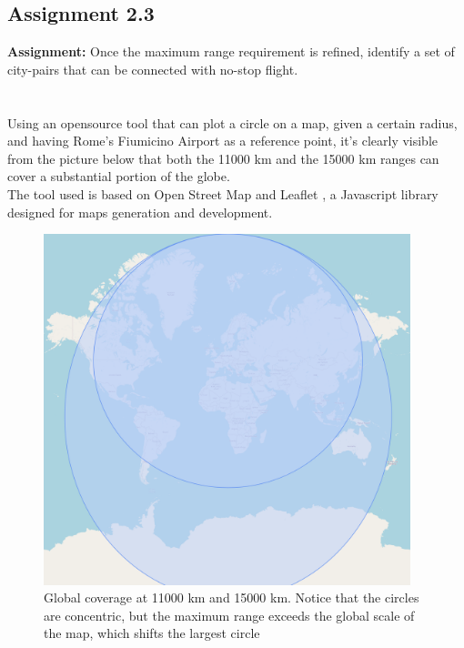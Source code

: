 \documentclass{article}
\begin{document}
\pagebreak
\subsection{Assignment 2.3\label{Assignment_2.3}}
\textbf{Assignment:} Once the maximum range requirement is refined,
 identify a set of city-pairs that can be connected with no-stop flight. \\ \\ \\ 

Using an opensource tool \autocite{OSM_radius_plotter} that can plot a circle on a map, given a certain radius, and having
Rome's Fiumicino Airport as a reference point, it's clearly visible from the picture below that both the 11000 km and the 15000 km ranges
can cover a substantial portion of the globe.\\ 
The tool used is based on Open Street Map \autocite{Open_Street_Map} and Leaflet \autocite{Leaflet}, a Javascript library
designed for maps generation and development. \\ 

\begin{figure}[h!]
    \centering
    \includegraphics[width=0.95\textwidth]{Sources/Plots_and_Pictures/OSM_radius.png}
    \caption{Global coverage at 11000 km and 15000 km. Notice that the circles are concentric,
    but the maximum range exceeds the global scale of the map, which shifts the largest circle}
    \label{Global_Coverage}
\end{figure}
\clearpage
\end{document}
